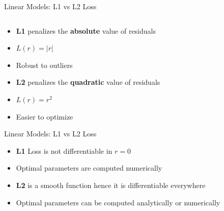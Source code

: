 \documentclass[11pt,compress,t,notes=noshow, xcolor=table]{beamer}
\begin{document}
\begin{vbframe}{Linear Models: L1 vs L2 Loss}
\begin{columns}
\begin{column}{0.4\textwidth}
\begin{center}
\end{center}
\end{column}
\end{columns}

\begin{minipage}[t]{0.45\textwidth}
    \footnotesize
    \begin{itemize}
        \item \small \textbf{L1} penalizes the \textbf{absolute} value of residuals 
        \item \textbf{$L(r) = |r|$}
        \item \small Robust to outliers

    \end{itemize}
\end{minipage}
\hfill
\begin{minipage}[t]{0.45\textwidth}
    \footnotesize
    \begin{itemize}
        \item \small \textbf{L2} penalizes the \textbf{quadratic} value of residuals
        \item \textbf{$L(r) = r^2$}
        \item \small Easier to optimize
    \end{itemize}
\end{minipage}


\end{vbframe}

\begin{vbframe}{Linear Models: L1 vs L2 Loss}

\begin{minipage}[t]{0.45\textwidth}
    \footnotesize
    \begin{itemize}
        \item \small \textbf{L1} Loss is not differentiable in \textbf{$r = 0$}
        \item \small Optimal parameters are computed numerically 

    \end{itemize}
\end{minipage}
\hfill
\begin{minipage}[t]{0.45\textwidth}
    \footnotesize
    \begin{itemize}
        \item \small \textbf{L2} is a smooth function hence it is differentiable everywhere 
        \item \small Optimal parameters can be computed analytically or numerically 
    \end{itemize}
\end{minipage}

\end{vbframe}
\end{document}

